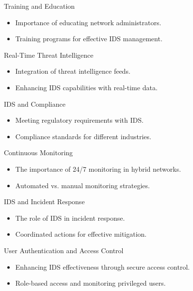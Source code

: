 \documentclass{beamer}
\begin{document}
\begin{frame}{Training and Education}
    \begin{itemize}
        \item Importance of educating network administrators.
        \item Training programs for effective IDS management.
    \end{itemize}
\end{frame}


\begin{frame}{Real-Time Threat Intelligence}
    \begin{itemize}
        \item Integration of threat intelligence feeds.
        \item Enhancing IDS capabilities with real-time data.
    \end{itemize}
\end{frame}


\begin{frame}{IDS and Compliance}
    \begin{itemize}
        \item Meeting regulatory requirements with IDS.
        \item Compliance standards for different industries.
    \end{itemize}
\end{frame}


\begin{frame}{Continuous Monitoring}
    \begin{itemize}
        \item The importance of 24/7 monitoring in hybrid networks.
        \item Automated vs. manual monitoring strategies.
    \end{itemize}
\end{frame}


\begin{frame}{IDS and Incident Response}
    \begin{itemize}
        \item The role of IDS in incident response.
        \item Coordinated actions for effective mitigation.
    \end{itemize}
\end{frame}


\begin{frame}{User Authentication and Access Control}
    \begin{itemize}
        \item Enhancing IDS effectiveness through secure access control.
        \item Role-based access and monitoring privileged users.
    \end{itemize}
\end{frame}
\end{document}
